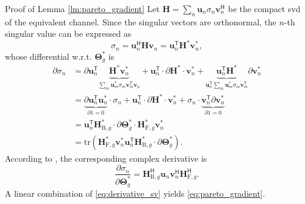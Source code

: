 \documentclass[journal]{IEEEtran}
\begin{document}
\begin{appendix}
	\begin{subsection}{Proof of Lemma \ref{lm:pareto_gradient}}\label{ap:pareto_gradient}
		Let $\mathbf{H} = \sum_n \mathbf{u}_n \sigma_n \mathbf{v}_n^\mathsf{H}$ be the compact \gls{svd} of the equivalent channel.
		Since the singular vectors are orthonormal, the $n$-th singular value can be expressed as
		\begin{equation}
			\sigma_n = \mathbf{u}_n^\mathsf{H} \mathbf{H} \mathbf{v}_n = \mathbf{u}_n^\mathsf{T} \mathbf{H}^* \mathbf{v}_n^*,
		\end{equation}
		whose differential w.r.t. $\mathbf{\Theta}_g^*$ is
		\begin{align*}
			\partial \sigma_n
			 & = \partial \mathbf{u}_n^\mathsf{T} \underbrace{\mathbf{H}^* \mathbf{v}_n^*}_{\sum_m \mathbf{u}_m^* \sigma_m \mathbf{v}_m^\mathsf{T} \mathbf{v}_n} + \mathbf{u}_n^\mathsf{T} \cdot \partial \mathbf{H}^* \cdot \mathbf{v}_n^* + \underbrace{\mathbf{u}_n^\mathsf{T} \mathbf{H}^*}_{\mathbf{u}_n^\mathsf{T} \sum_m \mathbf{u}_m^* \sigma_m \mathbf{v}_m^\mathsf{T}} \partial \mathbf{v}_n^* \\
			 & = \underbrace{\partial \mathbf{u}_n^\mathsf{T} \mathbf{u}_n^*}_{\partial 1 = 0} \cdot \sigma_n + \mathbf{u}_n^\mathsf{T} \cdot \partial \mathbf{H}^* \cdot \mathbf{v}_n^* + \sigma_n \cdot \underbrace{\mathbf{v}_n^\mathsf{T} \partial \mathbf{v}_n^*}_{\partial 1 = 0}                                                                                                                  \\
			 & = \mathbf{u}_n^\mathsf{T} \mathbf{H}_{\mathrm{B},g}^* \cdot \partial \mathbf{\Theta}_g^* \cdot \mathbf{H}_{\mathrm{F},g}^* \mathbf{v}_n^*                                                                                                                                                                                                                                                 \\
			 & = \mathrm{tr}(\mathbf{H}_{\mathrm{F},g}^* \mathbf{v}_n^*\mathbf{u}_n^\mathsf{T} \mathbf{H}_{\mathrm{B},g}^* \cdot \partial \mathbf{\Theta}_g^*).
		\end{align*}
		According to \cite{Hjorungnes2007}, the corresponding complex derivative is
		\begin{equation}
			\frac{\partial \sigma_n}{\partial \mathbf{\Theta}_g^*} = \mathbf{H}_{\mathrm{B},g}^\mathsf{H} \mathbf{u}_n \mathbf{v}_n^\mathsf{H} \mathbf{H}_{\mathrm{F},g}^\mathsf{H}.
			\label{eq:derivative_sv}
		\end{equation}
		A linear combination of \eqref{eq:derivative_sv} yields \eqref{eq:pareto_gradient}.
	\end{subsection}


\end{appendix}
\end{document}
